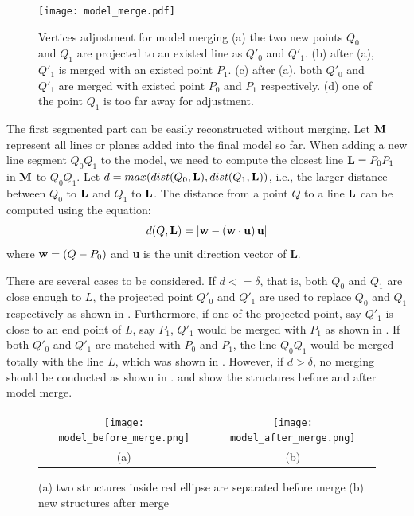 \begin{figure}[htbp]
  \centering
  \texttt{[image: model\_merge.pdf]}
      \caption{Vertices adjustment for model merging
      (a) the two new points $Q_0$ and $Q_1$ are projected to an existed line as $Q'_0$ and $Q'_1$.
      (b) after (a), $Q'_1$ is merged with an existed point $P_1$.
      (c) after (a), both $Q'_0$ and $Q'_1$ are merged with existed point $P_0$ and $P_1$ respectively.
      (d) one of the point $Q_1$ is too far away for adjustment. }
      \label{fig:MR_Fig1}
\end{figure}

The first segmented part can be easily reconstructed without merging. 
Let ${\bf M}$ represent all lines or planes added into the final model so far. 
When adding a new line segment $Q_0Q_1$ to the model, 
we need to compute the closest line ${\bf L} = P_0P_1$ in ${\bf M}$ to $Q_0Q_1$.
Let $d = max(dist(Q_0, {\bf L}), dist(Q_1, {\bf L}))$, i.e., the larger distance 
between $Q_0$ to ${\bf L}$ and $Q_1$ to ${\bf L}$.
The distance from a point $Q$ to a line ${\bf L}$ can be computed using the equation:
\begin{equation*} %
d(Q, { \bf L}) = | {\bf w - (w \cdot u) \, u} |
\end{equation*}
where ${\bf w} = (Q - P_0) $ and {\bf u} is the unit direction vector of {\bf L}.

There are several cases to be considered.
If $d <= \delta$, that is, both $Q_0$ and $Q_1$ are close enough to $L$, the projected point $Q'_0$ and $Q'_1$
are used to replace $Q_0$ and $Q_1$ respectively as shown in . 
Furthermore, if one of the projected point, say $Q'_1$ is close to an end point of $L$, say $P_1$, 
$Q'_1$ would be merged with $P_1$ as shown in . 
If both $Q'_0$ and $Q'_1$ are matched with $P_0$ and $P_1$, 
the line $Q_0Q_1$ would be merged totally with the line $L$, which was shown in .
However, if $d > \delta$, no merging should be conducted as shown in . 
 and  show the structures before and after model merge.


\begin{figure} [htbp]
\begin{center}
\begin{tabular}{cc}
\texttt{[image: model\_before\_merge.png]} &
\texttt{[image: model\_after\_merge.png]} \\
(a) & (b) 
\end{tabular}
\end{center}
\caption{ 
      (a) two structures inside red ellipse are separated before merge
      (b) new structures after merge}
\label{fig:MR_Fig2}
\end{figure}

